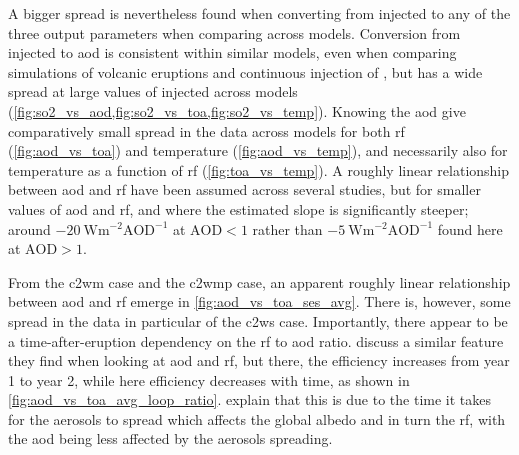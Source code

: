 \documentclass{ametsocV5}
\newcommand{\iso}[1][i]{{#1}njected \ce{SO2}}
\begin{document}
A bigger spread is nevertheless found when converting from \iso{} to any of the three
output parameters when comparing across models. Conversion from \iso{} to \ac{aod} is
consistent within similar models, even when comparing simulations of volcanic eruptions
\citep{timmreck2010} and continuous injection of  \citep{niemeier2015}, but has
a wide spread at large values of \iso{} across models
(\cref{fig:so2_vs_aod,fig:so2_vs_toa,fig:so2_vs_temp}). Knowing the \ac{aod} give
comparatively small spread in the data across models for both \ac{rf}
(\cref{fig:aod_vs_toa}) and temperature (\cref{fig:aod_vs_temp}), and necessarily also
for temperature as a function of \ac{rf} (\cref{fig:toa_vs_temp}). A roughly linear
relationship between \ac{aod} and \ac{rf} have been assumed across several studies, but
for smaller values of \ac{aod} and \ac{rf}, and where the estimated slope is
significantly steeper; around \(\SI{-20}{\watt\metre^{-2}\mathrm{AOD}^{-1}}\) at
\(\mathrm{AOD}<1\) rather than \(\SI{-5}{\watt\metre^{-2}\mathrm{AOD}^{-1}}\) found here
at \(\mathrm{AOD}>1\).

From the \ac{c2wm} case and the \ac{c2wmp} case, an apparent roughly linear relationship
between \ac{aod} and \ac{rf} emerge in \cref{fig:aod_vs_toa_ses_avg}. There is, however,
some spread in the data in particular of the \ac{c2ws} case. Importantly, there appear
to be a time-after-eruption dependency on the \ac{rf} to \ac{aod} ratio.
\citet{marshall2020} discuss a similar feature they find when looking at \ac{aod} and
\ac{rf}, but there, the efficiency increases from year 1 to year 2, while here
efficiency decreases with time, as shown in \cref{fig:aod_vs_toa_avg_loop_ratio}.
\citet{marshall2020} explain that this is due to the time it takes for the aerosols to
spread which affects the global albedo and in turn the \ac{rf}, with the \ac{aod} being
less affected by the aerosols spreading.
\end{document}
